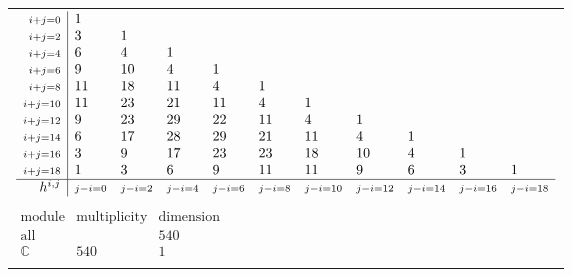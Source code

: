 \documentclass[crop,border=2mm]{standalone}
\begin{document}
\begin{tabular}{l}
$\displaystyle
\begin{array}{r|l l l l l l l l l l}
	{\scriptstyle i+j=0}&1&&&&&&&&&\\
	{\scriptstyle i+j=2}&3&1&&&&&&&&\\
	{\scriptstyle i+j=4}&6&4&1&&&&&&&\\
	{\scriptstyle i+j=6}&9&10&4&1&&&&&&\\
	{\scriptstyle i+j=8}&11&18&11&4&1&&&&&\\
	{\scriptstyle i+j=10}&11&23&21&11&4&1&&&&\\
	{\scriptstyle i+j=12}&9&23&29&22&11&4&1&&&\\
	{\scriptstyle i+j=14}&6&17&28&29&21&11&4&1&&\\
	{\scriptstyle i+j=16}&3&9&17&23&23&18&10&4&1&\\
	{\scriptstyle i+j=18}&1&3&6&9&11&11&9&6&3&1\\
	\hline h^{i,j}&{\scriptstyle j-i=0}&{\scriptstyle j-i=2}&{\scriptstyle j-i=4}&{\scriptstyle j-i=6}&{\scriptstyle j-i=8}&{\scriptstyle j-i=10}&{\scriptstyle j-i=12}&{\scriptstyle j-i=14}&{\scriptstyle j-i=16}&{\scriptstyle j-i=18}
\end{array}
$ \\ \\


$\displaystyle
\begin{array}{rll}
	\text{module}&\text{multiplicity}&\text{dimension} \\ \hline \text{all}&&540 \\
	\mathbb{C}&540&1
\end{array}
$ \\ \\

\end{tabular}
\end{document}
